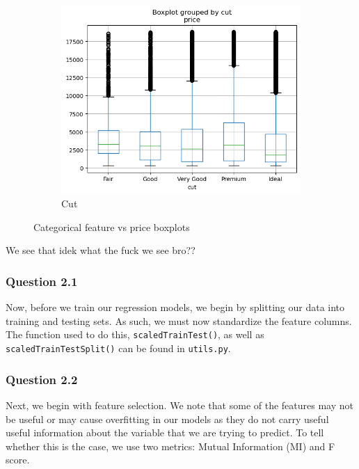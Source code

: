 \documentclass[11pt,letterpaper]{article}
\begin{document}
\begin{figure}[H]
    \hfill
    \begin{subfigure}[b]{0.3\textwidth}
        \centering
        \includegraphics[width=\textwidth]{../Figures/Question-1/cutBox.png}
        \caption{Cut}
        \label{fig:cutBox}
    \end{subfigure}
       \caption{Categorical feature vs price boxplots}
       \label{fig:boxPlots}
\end{figure}

We see that idek what the fuck we see bro??

\subsubsection*{Question 2.1}
Now, before we train our regression models, we begin by splitting our data into 
training and testing sets. As such, we must now standardize the feature columns.
The function used to do this, \texttt{scaledTrainTest()}, as well as \texttt{
scaledTrainTestSplit()} can be found in \texttt{utils.py}.

\subsubsection*{Question 2.2}
Next, we begin with feature selection. We note that some of the features may not
be useful or may cause overfitting in our models as they do not carry useful 
useful information about the variable that we are trying to predict. To tell 
whether this is the case, we use two metrics: Mutual Information (MI) and F 
score.
\end{document}
